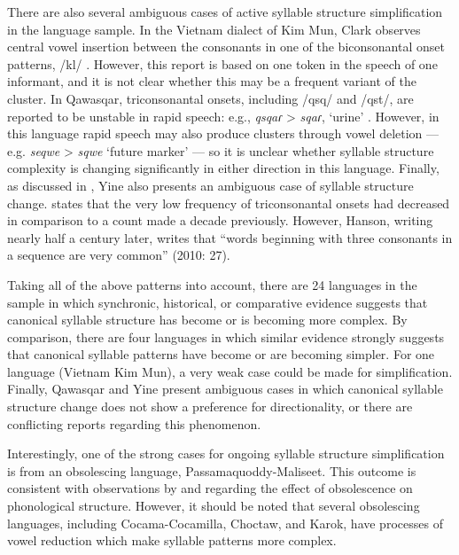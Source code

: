   There are also several ambiguous cases of active syllable structure simplification in the language sample. In the Vietnam dialect of Kim Mun, Clark observes central vowel insertion between the consonants in one of the biconsonantal onset patterns, /kl/ \citep[127]{Clark2008}. However, this report is based on one token in the speech of one informant, and it is not clear whether this may be a frequent variant of the cluster. In Qawasqar, triconsonantal onsets, including /qsq/ and /qst/, are reported to be unstable in rapid speech: e.g., \textit{qsqaɾ} > \textit{sqaɾ}, ‘urine’ \citep[393]{Clairis1985}. However, in this language rapid speech may also produce clusters through vowel deletion — e.g. \textit{seqwe} > \textit{sqwe} ‘future marker’ — so it is unclear whether syllable structure complexity is changing significantly in either direction in this language. Finally, as discussed in , Yine also presents an ambiguous case of syllable structure change. \citet[24]{Matteson1965} states that the very low frequency of triconsonantal onsets had decreased in comparison to a count made a decade previously. However, Hanson, writing nearly half a century later, writes that “words beginning with three consonants in a sequence are very common” (2010: 27).

  Taking all of the above patterns into account, there are 24 languages in the sample in which synchronic, historical, or comparative evidence suggests that canonical syllable structure has become or is becoming more complex. By comparison, there are four languages in which similar evidence strongly suggests that canonical syllable patterns have become or are becoming simpler. For one language (Vietnam Kim Mun), a very weak case could be made for simplification. Finally, Qawasqar and Yine present ambiguous cases in which canonical syllable structure change does not show a preference for directionality, or there are conflicting reports regarding this phenomenon.

  Interestingly, one of the strong cases for ongoing syllable structure simplification is from an obsolescing language, Passamaquoddy-Maliseet. This outcome is consistent with observations by \citet{Romaine2010} and \citet{Cook1989} regarding the effect of obsolescence on phonological structure. However, it should be noted that several obsolescing languages, including Cocama-Cocamilla, Choctaw, and Karok, have processes of vowel reduction which make syllable patterns more complex.

